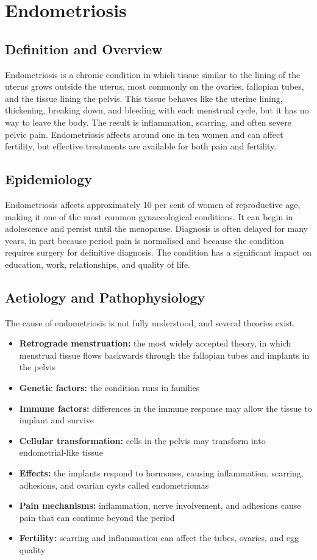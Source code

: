 \chapter{Endometriosis}

\section*{Definition and Overview}
Endometriosis is a chronic condition in which tissue similar to the lining of the uterus grows outside the uterus, most commonly on the ovaries, fallopian tubes, and the tissue lining the pelvis. This tissue behaves like the uterine lining, thickening, breaking down, and bleeding with each menstrual cycle, but it has no way to leave the body. The result is inflammation, scarring, and often severe pelvic pain. Endometriosis affects around one in ten women and can affect fertility, but effective treatments are available for both pain and fertility.

\section*{Epidemiology}
Endometriosis affects approximately 10 per cent of women of reproductive age, making it one of the most common gynaecological conditions. It can begin in adolescence and persist until the menopause. Diagnosis is often delayed for many years, in part because period pain is normalised and because the condition requires surgery for definitive diagnosis. The condition has a significant impact on education, work, relationships, and quality of life.

\section*{Aetiology and Pathophysiology}
The cause of endometriosis is not fully understood, and several theories exist.
\begin{itemize}
    \item \textbf{Retrograde menstruation:} the most widely accepted theory, in which menstrual tissue flows backwards through the fallopian tubes and implants in the pelvis
    \item \textbf{Genetic factors:} the condition runs in families
    \item \textbf{Immune factors:} differences in the immune response may allow the tissue to implant and survive
    \item \textbf{Cellular transformation:} cells in the pelvis may transform into endometrial-like tissue
    \item \textbf{Effects:} the implants respond to hormones, causing inflammation, scarring, adhesions, and ovarian cysts called endometriomas
    \item \textbf{Pain mechanisms:} inflammation, nerve involvement, and adhesions cause pain that can continue beyond the period
    \item \textbf{Fertility:} scarring and inflammation can affect the tubes, ovaries, and egg quality
\end{itemize}


